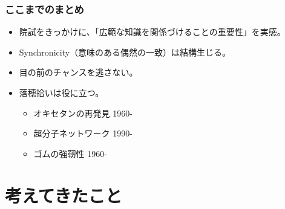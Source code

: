 \documentclass[unicode,12pt]{beamer}%
\begin{document}

\begin{frame}
    \frametitle{ここまでのまとめ}

    \begin{boxnote}
        \begin{itemize}
            \item 院試をきっかけに、\alert{「広範な知識を関係づけることの重要性」}を実感。
            \item Synchronicity（意味のある偶然の一致）は結構生じる。
            \item 目の前のチャンスを逃さない。
            \item 落穂拾いは役に立つ。
            \begin{itemize}
                \item オキセタンの再発見 1960-
                \item 超分子ネットワーク 1990-
                \item ゴムの強靭性 1960-
            \end{itemize}
        \end{itemize}
    \end{boxnote}

\end{frame}

\section{考えてきたこと}
\end{document}

